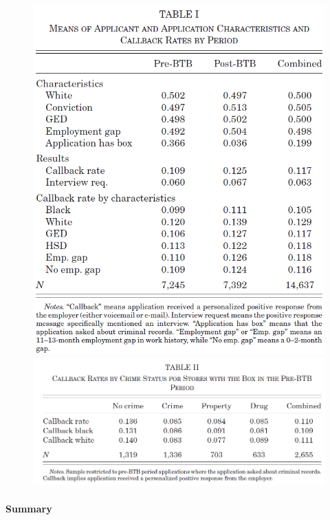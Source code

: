 \documentclass[../root]{subfiles}
\begin{document}
    \begin{figure}[ht]
        \centering
        \includegraphics[scale = .6]{0925tanji/T1}
        \includegraphics[scale = .6]{0925tanji/T2}
    \end{figure}

    \paragraph{Summary}
\end{document}
